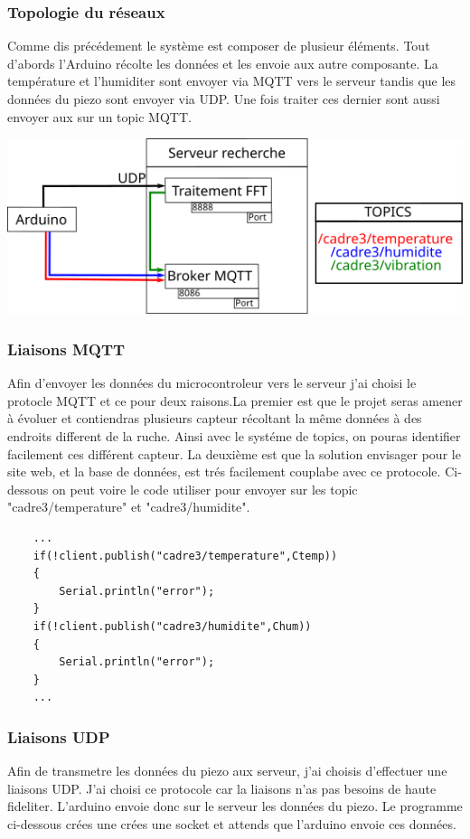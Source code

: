 \documentclass[11pt,french,a4paper]{article}
\begin{document}
\subsubsection{Topologie du réseaux}
Comme dis précédement le système est composer de plusieur éléments. Tout d'abords l'Arduino récolte les données et les envoie aux autre composante. La température et l'humiditer sont envoyer via MQTT vers le serveur tandis que les données du piezo sont envoyer via UDP. Une fois traiter ces dernier sont aussi envoyer aux sur un topic MQTT.
\begin{center}
    \includegraphics[scale=1]{../img/schemaNet.png}
    \label{SN}
\end{center}
\subsubsection{Liaisons MQTT}
Afin d'envoyer les données du microcontroleur vers le serveur j'ai choisi le protocle MQTT et ce pour deux raisons.La premier est que le projet seras amener à évoluer et contiendras plusieurs capteur récoltant la même données à des endroits different de la ruche. Ainsi avec le systéme de topics, on pouras identifier facilement ces différent capteur. La deuxième est que la solution envisager pour le site web, et la base de données, est trés facilement couplabe avec ce protocole. 
Ci-dessous on peut voire le code utiliser pour envoyer sur les topic "cadre3/temperature" et "cadre3/humidite". 
\begin{scriptsize}
\begin{lstlisting}
	...
	if(!client.publish("cadre3/temperature",Ctemp))
	{
		Serial.println("error");
	}
	if(!client.publish("cadre3/humidite",Chum))
	{
		Serial.println("error");
	}
	...
\end{lstlisting}
\end{scriptsize}

\subsubsection{Liaisons UDP}
Afin de transmetre les données du piezo aux serveur, j'ai choisis d'effectuer une liaisons UDP. J'ai choisi ce protocole car la liaisons n'as pas besoins de haute fideliter. L'arduino envoie donc sur le serveur les données du piezo. Le programme ci-dessous crées une crées une socket et attends que l'arduino envoie ces données. 
\end{document}
